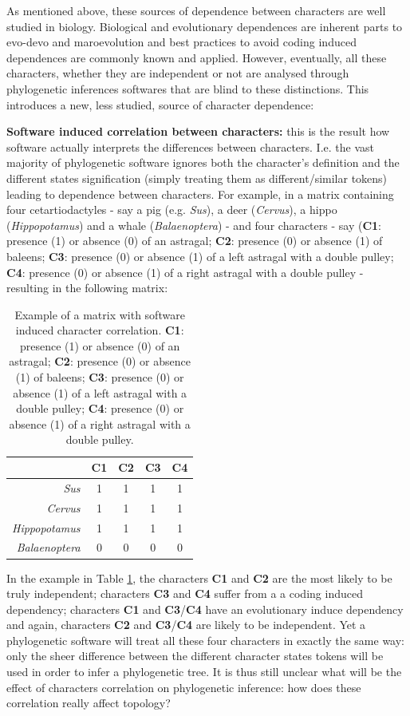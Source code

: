 \documentclass[12pt,letterpaper]{article}
\begin{document}
As mentioned above, these sources of dependence between characters are well studied in biology.
Biological and evolutionary dependences are inherent parts to evo-devo and maroevolution and best practices to avoid coding induced dependences are commonly known and applied.
However, eventually, all these characters, whether they are independent or not are analysed through phylogenetic inferences softwares that are blind to these distinctions.
This introduces a new, less studied, source of character dependence:

\noindent \textbf{Software induced correlation between characters:} this is the result how software actually interprets the differences between characters.
I.e. the vast majority of phylogenetic software ignores both the character's definition and the different states signification (simply treating them as different/similar tokens) leading to dependence between characters.
For example, in a matrix containing four cetartiodactyles - say a pig (e.g. \textit{Sus}), a deer (\textit{Cervus}), a hippo (\textit{Hippopotamus}) and a whale (\textit{Balaenoptera}) - and four characters - say (\textbf{C1}: presence (1) or absence (0) of an astragal; \textbf{C2}: presence (0) or absence (1) of baleens; \textbf{C3}: presence (0) or absence (1) of a left astragal with a double pulley; \textbf{C4}: presence (0) or absence (1) of a right astragal with a double pulley - resulting in the following matrix:

\begin{table}
\center
    \begin{tabular}{r|cccc}
            & C1 & C2 & C3 & C4\\
        \hline
        \textit{Sus} & 1 & 1 & 1 & 1\\
        \textit{Cervus} & 1 & 1 & 1 & 1\\
        \textit{Hippopotamus} & 1 & 1 & 1 & 1\\
        \textit{Balaenoptera} & 0 & 0 & 0 & 0\\
    \end{tabular}
    \caption{Example of a matrix with software induced character correlation. \textbf{C1}: presence (1) or absence (0) of an astragal; \textbf{C2}: presence (0) or absence (1) of baleens; \textbf{C3}: presence (0) or absence (1) of a left astragal with a double pulley; \textbf{C4}: presence (0) or absence (1) of a right astragal with a double pulley.}
    \label{Tab:example_matrix}
\end{table}

In the example in Table \ref{Tab:example_matrix}, the characters \textbf{C1} and \textbf{C2} are the most likely to be truly independent; characters \textbf{C3} and \textbf{C4} suffer from a a coding induced dependency; characters \textbf{C1} and \textbf{C3}/\textbf{C4} have an evolutionary induce dependency and again, characters \textbf{C2} and \textbf{C3}/\textbf{C4} are likely to be independent.
Yet a phylogenetic software will treat all these four characters in exactly the same way: only the sheer difference between the different character states tokens will be used in order to infer a phylogenetic tree.
It is thus still unclear what will be the effect of characters correlation on phylogenetic inference: how does these correlation really affect topology?
\end{document}
